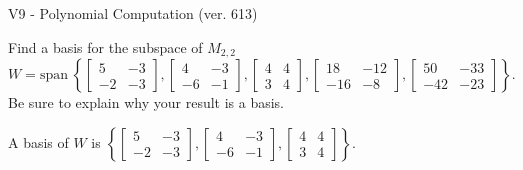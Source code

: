 \begin{exercise}
  \begin{exerciseTitle}V9 - Polynomial Computation (ver. 613)\end{exerciseTitle}
  \begin{exerciseStatement}
    Find a basis for the subspace of \(M_{2,2}\) 
\[W=\mathrm{span}\ \left\{\left[\begin{array}{cc}
5 & -3 \\
-2 & -3
\end{array}\right] , \left[\begin{array}{cc}
4 & -3 \\
-6 & -1
\end{array}\right] , \left[\begin{array}{cc}
4 & 4 \\
3 & 4
\end{array}\right] , \left[\begin{array}{cc}
18 & -12 \\
-16 & -8
\end{array}\right] , \left[\begin{array}{cc}
50 & -33 \\
-42 & -23
\end{array}\right]\right\}.\]
 Be sure to explain why your result is a basis.


  \end{exerciseStatement}
  \begin{exerciseAnswer}
   A basis of \(W\) is  \(\left\{\left[\begin{array}{cc}
5 & -3 \\
-2 & -3
\end{array}\right] , \left[\begin{array}{cc}
4 & -3 \\
-6 & -1
\end{array}\right] , \left[\begin{array}{cc}
4 & 4 \\
3 & 4
\end{array}\right]\right\}\).
  


  \end{exerciseAnswer}
\end{exercise}